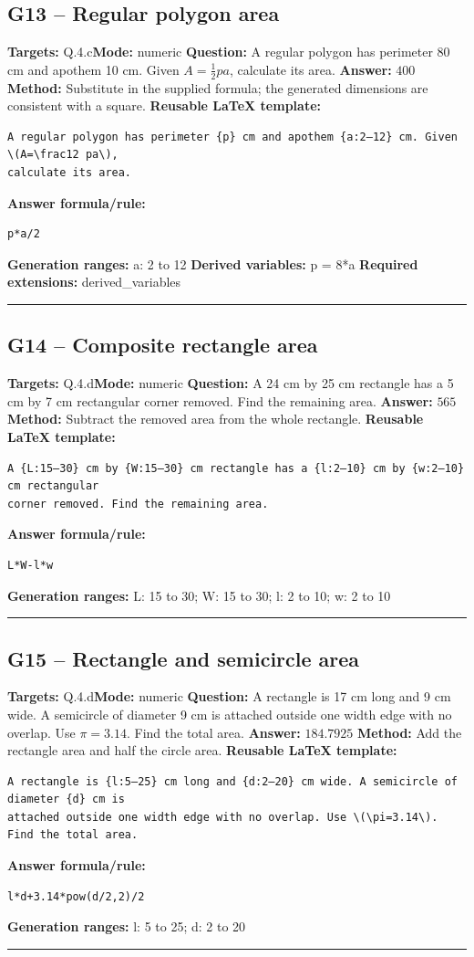 \documentclass[11pt]{article}
\begin{document}
\subsection{G13 -- Regular polygon area}
\textbf{Targets:} Q.4.c\quad\textbf{Mode:} numeric
\textbf{Question:} A regular polygon has perimeter 80 cm and apothem 10 cm. Given \(A=\frac12 pa\), calculate its area.
\textbf{Answer:} \(400\)
\textbf{Method:} Substitute in the supplied formula; the generated dimensions are consistent with a square.
\textbf{Reusable LaTeX template:}
\begin{verbatim}
A regular polygon has perimeter {p} cm and apothem {a:2–12} cm. Given \(A=\frac12 pa\),
calculate its area.
\end{verbatim}
\textbf{Answer formula/rule:}
\begin{verbatim}
p*a/2
\end{verbatim}
\textbf{Generation ranges:} a: 2 to 12
\textbf{Derived variables:} p = 8*a
\textbf{Required extensions:} derived\_variables
\medskip\hrule\medskip
\subsection{G14 -- Composite rectangle area}
\textbf{Targets:} Q.4.d\quad\textbf{Mode:} numeric
\textbf{Question:} A 24 cm by 25 cm rectangle has a 5 cm by 7 cm rectangular corner removed. Find the remaining area.
\textbf{Answer:} \(565\)
\textbf{Method:} Subtract the removed area from the whole rectangle.
\textbf{Reusable LaTeX template:}
\begin{verbatim}
A {L:15–30} cm by {W:15–30} cm rectangle has a {l:2–10} cm by {w:2–10} cm rectangular
corner removed. Find the remaining area.
\end{verbatim}
\textbf{Answer formula/rule:}
\begin{verbatim}
L*W-l*w
\end{verbatim}
\textbf{Generation ranges:} L: 15 to 30; W: 15 to 30; l: 2 to 10; w: 2 to 10
\medskip\hrule\medskip
\subsection{G15 -- Rectangle and semicircle area}
\textbf{Targets:} Q.4.d\quad\textbf{Mode:} numeric
\textbf{Question:} A rectangle is 17 cm long and 9 cm wide. A semicircle of diameter 9 cm is attached outside one width edge with no overlap. Use \(\pi=3.14\). Find the total area.
\textbf{Answer:} \(184.7925\)
\textbf{Method:} Add the rectangle area and half the circle area.
\textbf{Reusable LaTeX template:}
\begin{verbatim}
A rectangle is {l:5–25} cm long and {d:2–20} cm wide. A semicircle of diameter {d} cm is
attached outside one width edge with no overlap. Use \(\pi=3.14\). Find the total area.
\end{verbatim}
\textbf{Answer formula/rule:}
\begin{verbatim}
l*d+3.14*pow(d/2,2)/2
\end{verbatim}
\textbf{Generation ranges:} l: 5 to 25; d: 2 to 20
\medskip\hrule\medskip
\end{document}
